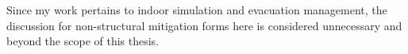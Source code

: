 Since my work pertains to indoor simulation and evacuation management, the discussion for non-structural mitigation forms here is considered unnecessary and beyond the scope of this thesis.   







